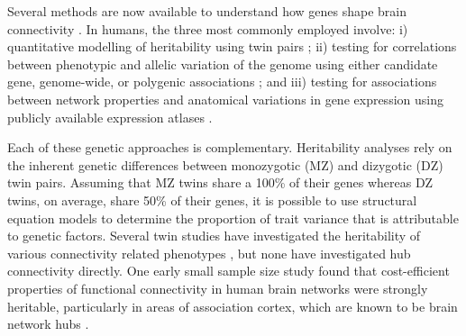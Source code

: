 Several methods are now available to understand how genes shape brain connectivity \citep{Lein2017,Luo2018}. In humans, the three most commonly employed involve: i) quantitative modelling of heritability using twin pairs  \citep{Jansen2015}; ii) testing for correlations between phenotypic and allelic variation of the genome using either candidate gene, genome-wide, or polygenic associations \citep{Thompson2013}; and iii) testing for associations between network properties and anatomical variations in gene expression using publicly available expression atlases \citep{Fornito2019}.

Each of these genetic approaches is complementary. Heritability analyses rely on the inherent genetic differences between monozygotic (MZ) and dizygotic (DZ) twin pairs. Assuming that MZ twins share a 100\% of their genes whereas DZ twins, on average, share 50\% of their genes, it is possible to use structural equation models to determine the proportion of trait variance that is attributable to genetic factors. Several twin studies have investigated the heritability of various connectivity related phenotypes \citep{Bohlken2014,Colclough2017,Fu2015,Shen2014,Sudre2017}, but none have investigated hub connectivity directly. One early small sample size study found that cost-efficient properties of functional connectivity in human brain networks were strongly heritable, particularly in areas of association cortex, which are known to be brain network hubs \citep{Fornito2011}.

